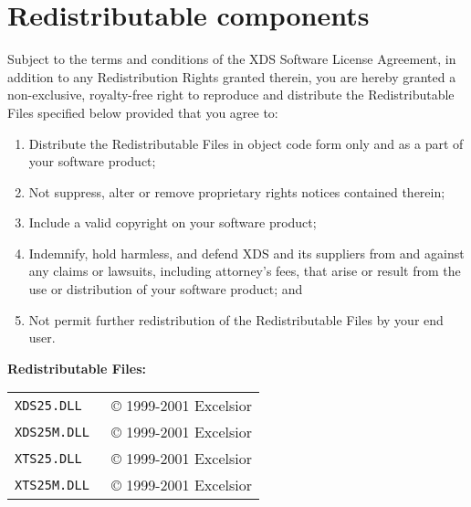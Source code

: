 \chapter{Redistributable components}
\label{redistr}

 Subject to the terms and conditions of the XDS Software License Agreement,
 in addition to any Redistribution Rights granted therein, you are hereby
 granted a non-exclusive, royalty-free right to reproduce and distribute
 the Redistributable Files specified below provided that you agree to:

\begin{enumerate}
\item Distribute the Redistributable Files in object code form only and
      as a part of your software product;
\item Not suppress, alter or remove proprietary rights notices contained therein;
\item Include a valid copyright on your software product;
\item Indemnify, hold harmless, and defend XDS and its suppliers from and against
      any claims or lawsuits, including attorney's fees, that arise or result
      from the use or distribution of your software product; and
\item Not permit further redistribution of the Redistributable Files by your end user.
\end{enumerate}

{\bf Redistributable Files:}

\begin{tabular}{ll}
\tt XDS25.DLL  & \copyright{} 1999-2001 Excelsior \\
\tt XDS25M.DLL & \copyright{} 1999-2001 Excelsior \\
\tt XTS25.DLL  & \copyright{} 1999-2001 Excelsior \\
\tt XTS25M.DLL & \copyright{} 1999-2001 Excelsior
\end{tabular}

